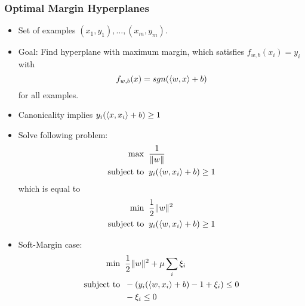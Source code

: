 \documentclass{scrartcl}
\newcommand{\ffrac}[2]{\ensuremath{\frac{\displaystyle #1}{\displaystyle #2}}}
\DeclarePairedDelimiter\norm{\lVert}{\rVert}%
\DeclarePairedDelimiter\inner{\langle}{\rangle}%
\begin{document}
\subsubsection{Optimal Margin Hyperplanes}
\begin{itemize}
    \item
        Set of examples $(x_1, y_1), \dots, (x_m, y_m)$.
    \item
        Goal: Find hyperplane with maximum margin, which satisfies $f_{w,b}(x_i) = y_i$ with
        $$f_{w,b}(x) = sgn(\inner{w,x}+b)$$
        for all examples.
    \item
        Canonicality implies $y_i(\inner{x, x_i}+b) \geq 1$
    \item
        Solve following problem:
        \begin{align*}
            \max \; \; & \ffrac{1}{\norm{w}}\\
						\text{subject to} \; \; & y_i(\inner{w, x_i}+b) \geq 1 %
        \end{align*}
        which is equal to
        \begin{align*}
            \min\; \; & \ffrac{1}{2}\norm{w}^2\\
						\text{subject to} \; \; & y_i(\inner{w, x_i}+b) \geq 1 %
        \end{align*}
    \item
        Soft-Margin case:
        \begin{align*}
            \min\; \; & \ffrac{1}{2}\norm{w}^2 + \mu \sum_i \xi_i\\
						\text{subject to} \; \; & -(y_i(\inner{w, x_i}+b)-1+\xi_i) \leq 0 \\%
            & -\xi_i \leq 0 \;\; %
        \end{align*}

\end{itemize}
\end{document}
